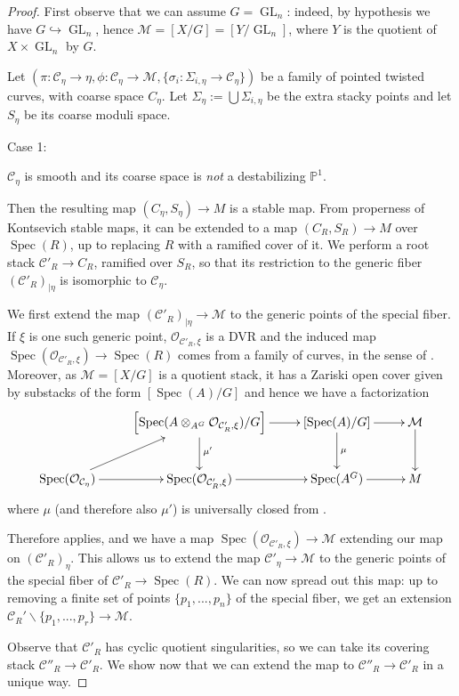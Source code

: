 \documentclass{amsart}
\newcommand{\bP}{\mathbb{P}}
\newcommand{\cC}{\mathcal{C}}
\newcommand{\cM}{\mathcal{M}}
\newcommand{\cO}{\mathcal{O}}
\newcommand{\spec}{\operatorname{Spec}}
\newcommand{\GL}{\operatorname{GL}}
\theoremstyle{definition}
\begin{document}
\begin{proof}
First observe that we can assume $G=\GL_n$: indeed, by hypothesis we have $G\hookrightarrow \GL_n$, hence $\cM=[X/G]=[Y/\GL_n]$, where $Y$ is the quotient of $X\times\GL_n$ by $G$.

Let $(\pi:\cC_\eta\to \eta, \phi:\cC_\eta\to \cM,\{\sigma_i : \Sigma_{i,\eta} \to \cC_\eta\})$ be a family of pointed twisted curves, with coarse space $C_\eta$. Let $\Sigma_\eta := \bigcup \Sigma_{i,\eta}$ be the extra stacky points and let $S_\eta $ be its coarse moduli space.

\begin{bf}Case 1: \end{bf} $\cC_\eta$ is smooth and its coarse space is \textit{not} a destabilizing $\bP^1$.

Then the resulting map $(C_\eta, S_\eta)\to M$ is a stable map. From properness of Kontsevich stable maps, it can be extended to a map $(C_R, S_R)\to M$ over $\spec(R)$, up to replacing $R$ with a ramified cover of it. We perform a root stack $\cC'_R\to C_R$, ramified over $S_R$, so that its restriction to the generic fiber $(\cC'_R)_{|\eta}$ is isomorphic to $\cC_\eta$.

We first extend the map $(\cC'_R)_{|\eta}\to \cM$ to the generic points of the special fiber. If $\xi$ is one such generic point, $\cO_{\cC'_R,\xi}$ is a DVR and the induced map $\spec(\cO_{\cC'_R,\xi})\to\spec(R)$ comes from a family of curves, in the sense of . Moreover, as $\cM=[X/G]$ is a quotient stack, it has a Zariski open cover given by substacks of the form $[\spec(A)/G]$ and hence we have a factorization
\[
\xymatrix{
    & \left[\spec(A\otimes_{A^G}\cO_{\cC'_R,\xi})/G\right]\ar[r] \ar[d]^{\mu'} & \left[\spec(A)/G\right] \ar[r] \ar[d]^{\mu}& \cM \ar[d] \\\spec(\cO_{\cC_\eta})\ar[r] \ar[ru]&
    \spec(\cO_{\cC'_R,\xi}) \ar[r] & \spec(A^G) \ar[r] & M}
\]
where $\mu$ (and therefore also $\mu'$) is universally closed from \cite[Theorem A.8]{AHH}.

Therefore  applies, and we have a map $\spec(\cO_{\cC'_R,\xi})\to \cM$ extending our map on $(\cC'_R)_\eta$. This allows us to extend the map $\cC'_\eta \to \cM$ to the generic points of the special fiber of $\cC'_R\to \spec(R)$.  We can now spread out this map: up to removing a finite set of points $\{p_1,...,p_n\}$ of the special fiber,  we get an extension $\cC_R'\smallsetminus \{p_1,...,p_r\}\to \cM$. 

Observe that $\cC'_R$ has cyclic quotient singularities, so we can take its covering stack $\cC''_R\to \cC'_R$. We show now that we can extend the map to $\cC''_R\to \cC'_R$ in a unique way. 


\end{proof}
\end{document}
